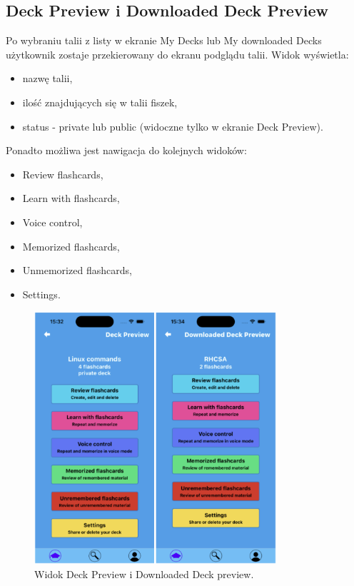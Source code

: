 \subsection{Deck Preview i Downloaded Deck Preview}
Po wybraniu talii z listy w ekranie My Decks lub My downloaded Decks użytkownik zostaje przekierowany do ekranu podglądu talii. Widok wyświetla:
\begin{itemize}
    \item nazwę talii,
    \item ilość znajdujących się w talii fiszek,
    \item status - private lub public (widoczne tylko w ekranie Deck Preview).
\end{itemize}

Ponadto możliwa jest nawigacja do kolejnych widoków:
\begin{itemize}
    \item Review flashcards,
    \item Learn with flashcards,
    \item Voice control,
    \item Memorized flashcards,
    \item Unmemorized flashcards,
    \item Settings.
\end{itemize}

\begin{figure}[H]
    \centering
    \includegraphics[width=0.8\textwidth]{chapters/chapter_10/images_mobile/mobile_deck_preview}
    \caption{Widok Deck Preview i Downloaded Deck preview.}
    \label{img:mobile_deck_preview}
\end{figure}



